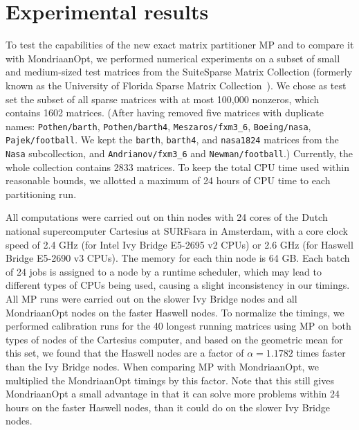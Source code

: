 \section{Experimental results}
\label{sec:experiments}
To test the capabilities of the new exact matrix partitioner MP
and to compare it with MondriaanOpt, we performed numerical experiments
on a subset of small and medium-sized test matrices from the SuiteSparse
Matrix Collection (formerly known as the University
of Florida Sparse Matrix Collection~\cite{davis11}).
We chose as test set the subset of all sparse matrices with at most 100,000 nonzeros,
which contains 1602 matrices. (After having removed five matrices with duplicate names:
	\texttt{Pothen/\-barth}, \texttt{Pothen/\-barth4}, \texttt{Mesz\-aros/\-fxm3\_6},
    \texttt{Boeing/\-nasa}, \texttt{Pajek/\-foot\-ball}.
	We kept the \texttt{barth}, \texttt{barth4}, and \texttt{nasa1824} matrices
          from the \texttt{Nasa} subcollection, and  \texttt{Andri\-anov/\-fxm3\_6} and
          \texttt{New\-man/\-foot\-ball}.)
Currently, the whole collection contains 2833 matrices.
To keep the total CPU time used within reasonable bounds, we allotted
a maximum of 24 hours of CPU time to each partitioning run.

All computations were carried out on thin nodes with 24 cores of the Dutch national supercomputer
Cartesius at  SURFsara in Amsterdam, with a core clock speed of 2.4 GHz (for Intel Ivy Bridge E5-2695 v2  CPUs)
or 2.6 GHz (for Haswell Bridge E5-2690 v3 CPUs). The memory for each 
 thin node is 64 GB. Each batch of 24 jobs is assigned to a node by a runtime scheduler,
which may lead to different types of CPUs being used, causing a slight inconsistency in our timings.
All MP runs were carried out on the slower Ivy Bridge nodes and all MondriaanOpt nodes on the faster
Haswell nodes.
To normalize the timings, we performed calibration runs for the 40 longest running matrices
using MP on both types of nodes of the Cartesius computer, and based on the geometric mean for this set,
we found that the Haswell nodes 
are a factor of  $\alpha= 1.1782$ times faster than the Ivy Bridge nodes.
When comparing MP with MondriaanOpt, we multiplied the MondriaanOpt timings
by this factor. Note that this still gives MondriaanOpt a small advantage in that it can solve more problems
within 24 hours on the faster Haswell nodes, than it could do on the slower Ivy Bridge nodes.

